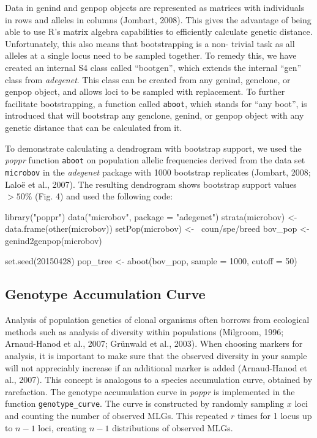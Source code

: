 \documentclass{frontiersSCNS} %
\newenvironment{CodeChunk}{}{}
\begin{document}
Data in genind and genpop objects are represented as matrices with
individuals in rows and alleles in columns (Jombart, 2008). This gives
the advantage of being able to use R's matrix algebra capabilities to
efficiently calculate genetic distance. Unfortunately, this also means
that bootstrapping is a non- trivial task as all alleles at a single
locus need to be sampled together. To remedy this, we have created an
internal S4 class called ``bootgen'', which extends the internal ``gen''
class from \emph{adegenet}. This class can be created from any genind,
genclone, or genpop object, and allows loci to be sampled with
replacement. To further facilitate bootstrapping, a function called
\texttt{aboot}, which stands for ``any boot'', is introduced that will
bootstrap any genclone, genind, or genpop object with any genetic
distance that can be calculated from it.

To demonstrate calculating a dendrogram with bootstrap support, we used
the \emph{poppr} function \texttt{aboot} on population allelic
frequencies derived from the data set \texttt{microbov} in the
\emph{adegenet} package with 1000 bootstrap replicates (Jombart, 2008;
Lalo{ë} et al., 2007). The resulting dendrogram shows bootstrap support
values \(>50\%\) (Fig. 4) and used the following code:

\begin{CodeChunk}
\begin{CodeInput}
library("poppr")
data("microbov", package = "adegenet") 
strata(microbov) <- data.frame(other(microbov)) 
setPop(microbov) <- ~coun/spe/breed 
bov_pop <- genind2genpop(microbov) 

set.seed(20150428)
pop_tree <- aboot(bov_pop, sample = 1000, cutoff = 50)
\end{CodeInput}
\end{CodeChunk}

\subsection*{Genotype Accumulation
Curve}\label{genotype-accumulation-curve}

Analysis of population genetics of clonal organisms often borrows from
ecological methods such as analysis of diversity within populations
(Milgroom, 1996; Arnaud-Hanod et al., 2007; Grünwald et al., 2003). When
choosing markers for analysis, it is important to make sure that the
observed diversity in your sample will not appreciably increase if an
additional marker is added (Arnaud-Hanod et al., 2007). This concept is
analogous to a species accumulation curve, obtained by rarefaction. The
genotype accumulation curve in \emph{poppr} is implemented in the
function \texttt{genotype\_curve}. The curve is constructed by randomly
sampling \(x\) loci and counting the number of observed MLGs. This
repeated \(r\) times for 1 locus up to \(n-1\) loci, creating \(n-1\)
distributions of observed MLGs.
\end{document}
